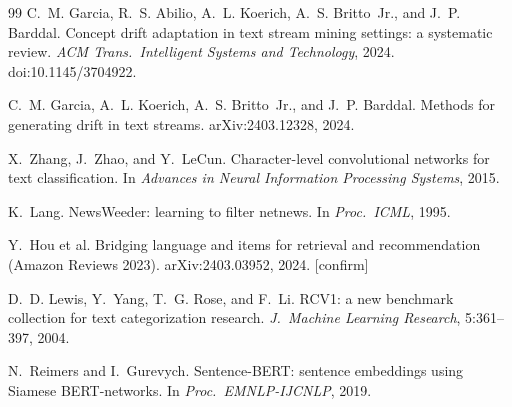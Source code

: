 \documentclass[11pt,a4paper]{article}
\newcommand{\todo}[1]{\textcolor{red!70!black}{[#1]}}
\begin{document}
\begin{thebibliography}{99}
 C.~M. Garcia, R.~S. Abilio, A.~L. Koerich, A.~S. Britto~Jr., and J.~P. Barddal. Concept drift adaptation in text stream mining settings: a systematic review. \emph{ACM Trans.\ Intelligent Systems and Technology}, 2024. doi:10.1145/3704922.

 C.~M. Garcia, A.~L. Koerich, A.~S. Britto~Jr., and J.~P. Barddal. Methods for generating drift in text streams. arXiv:2403.12328, 2024.

 X.~Zhang, J.~Zhao, and Y.~LeCun. Character-level convolutional networks for text classification. In \emph{Advances in Neural Information Processing Systems}, 2015.

 K.~Lang. NewsWeeder: learning to filter netnews. In \emph{Proc.\ ICML}, 1995.

 Y.~Hou et al. Bridging language and items for retrieval and recommendation (Amazon Reviews 2023). arXiv:2403.03952, 2024. \todo{confirm}

 D.~D. Lewis, Y.~Yang, T.~G. Rose, and F.~Li. RCV1: a new benchmark collection for text categorization research. \emph{J.\ Machine Learning Research}, 5:361--397, 2004.

 N.~Reimers and I.~Gurevych. Sentence-BERT: sentence embeddings using Siamese BERT-networks. In \emph{Proc.\ EMNLP-IJCNLP}, 2019.

\end{thebibliography}
\end{document}
